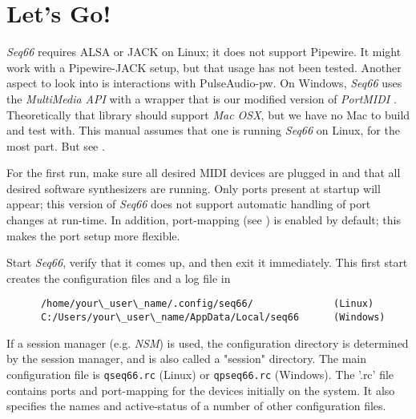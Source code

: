 %
%
%

\section{Let's Go!}
\label{sec:introduction_lets_go}

   \textsl{Seq66} requires ALSA or JACK on Linux;
   it does not support
   Pipewire.
   It might work with a Pipewire-JACK setup, but that usage has not been
   tested.
   Another aspect to look into is interactions with
   PulseAudio-pw.
   On Windows, \textsl{Seq66} uses the \textsl{MultiMedia API} with a wrapper
   that is our modified version of \textsl{PortMIDI} \cite{portmidi}.
   Theoretically that library should support
   \textsl{Mac OSX}, but we have no Mac to build and test with.
   This manual assumes that one is running \textsl{Seq66} on Linux, for the
   most part.
   But see .

   For the first run, make sure all desired MIDI devices are plugged in and
   that all desired software synthesizers are running.
   Only ports present at startup will appear; this version of
   \textsl{Seq66} does not
   support automatic handling of port changes at run-time.
   In addition, port-mapping (see ) is
   enabled by default; this makes the port setup more flexible.

   Start \textsl{Seq66}, verify that it comes up, and then exit it
   immediately.
   This first start creates the configuration files and a log file in

   \begin{verbatim}
      /home/your\_user\_name/.config/seq66/              (Linux)
      C:/Users/your\_user\_name/AppData/Local/seq66      (Windows)
   \end{verbatim}

   If a session manager (e.g. \textsl{NSM})
   is used, the configuration directory is determined by
   the session manager, and is also called a "session" directory.
   The main configuration file is
   \texttt{qseq66.rc} (Linux) or
   \texttt{qpseq66.rc} (Windows).
   The '.rc' file contains ports and port-mapping for the devices
   initially on the system.
   It also specifies the names and active-status
   of a number of other configuration files.


